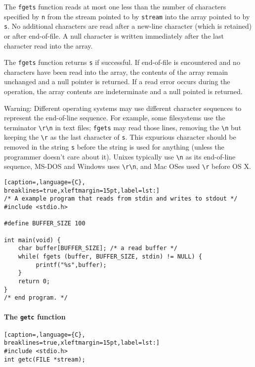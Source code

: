 The \texttt{fgets} function reads at most one less than the number of
characters specified by \texttt{n} from the stream pointed to by
\texttt{stream} into the array pointed to by \texttt{s}. No additional
characters are read after a new-line character (which is retained) or after
end-of-file. A null character is written immediately after the last character
read into the array.

The \texttt{fgets} function returns \texttt{s} if successful. If end-of-file is
encountered and no characters have been read into the array, the contents of
the array remain unchanged and a null pointer is returned. If a read error
occurs during the operation, the array contents are indeterminate and a null
pointed is returned.

Warning: Different operating systems may use different character sequences to
represent the end-of-line sequence. For example, some filesystems use the
terminator \texttt{\textbackslash{}r\textbackslash{}n} in text files;
\texttt{fgets} may read those lines, removing the \texttt{\textbackslash{}n}
but keeping the \texttt{\textbackslash{}r} as the last character of \texttt{s}.
This expurious character should be removed in the string \texttt{s} before the
string is used for anything (unless the programmer doesn't care about it).
Unixes typically use \texttt{\textbackslash{}n} as its end-of-line sequence,
MS-DOS and Windows uses \texttt{\textbackslash{}r\textbackslash{}n}, and Mac
OSes used \texttt{\textbackslash{}r} before OS X.
\lstset{basicstyle=\scriptsize, numbers=left, captionpos=b, tabsize=4}
\begin{lstlisting}[caption=,language={C},
breaklines=true,xleftmargin=15pt,label=lst:]
/* A example program that reads from stdin and writes to stdout */
#include <stdio.h>

#define BUFFER_SIZE 100

int main(void) {
	char buffer[BUFFER_SIZE]; /* a read buffer */
	while( fgets (buffer, BUFFER_SIZE, stdin) != NULL) {
	     printf("%s",buffer);
	}
	return 0;
}
/* end program. */
\end{lstlisting}

\paragraph{The \texttt{getc} function}
\lstset{basicstyle=\scriptsize, numbers=left, captionpos=b, tabsize=4}
\begin{lstlisting}[caption=,language={C},
breaklines=true,xleftmargin=15pt,label=lst:]
#include <stdio.h>
int getc(FILE *stream);
\end{lstlisting}

